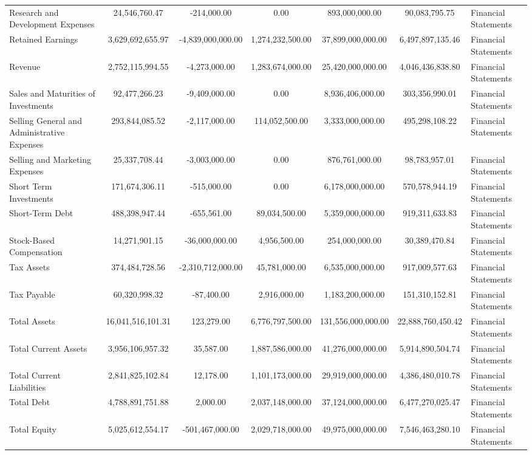 \begin{tabular}{lccccc}
Research and Development Expenses & 24,546,760.47 & -214,000.00 & 0.00 & 893,000,000.00 & 90,083,795.75 & Financial Statements \\
Retained Earnings & 3,629,692,655.97 & -4,839,000,000.00 & 1,274,232,500.00 & 37,899,000,000.00 & 6,497,897,135.46 & Financial Statements \\
Revenue & 2,752,115,994.55 & -4,273,000.00 & 1,283,674,000.00 & 25,420,000,000.00 & 4,046,436,838.80 & Financial Statements \\
Sales and Maturities of Investments & 92,477,266.23 & -9,409,000.00 & 0.00 & 8,936,406,000.00 & 303,356,990.01 & Financial Statements \\
Selling General and Administrative Expenses & 293,844,085.52 & -2,117,000.00 & 114,052,500.00 & 3,333,000,000.00 & 495,298,108.22 & Financial Statements \\
Selling and Marketing Expenses & 25,337,708.44 & -3,003,000.00 & 0.00 & 876,761,000.00 & 98,783,957.01 & Financial Statements \\
Short Term Investments & 171,674,306.11 & -515,000.00 & 0.00 & 6,178,000,000.00 & 570,578,944.19 & Financial Statements \\
Short-Term Debt & 488,398,947.44 & -655,561.00 & 89,034,500.00 & 5,359,000,000.00 & 919,311,633.83 & Financial Statements \\
Stock-Based Compensation & 14,271,901.15 & -36,000,000.00 & 4,956,500.00 & 254,000,000.00 & 30,389,470.84 & Financial Statements \\
Tax Assets & 374,484,728.56 & -2,310,712,000.00 & 45,781,000.00 & 6,535,000,000.00 & 917,009,577.63 & Financial Statements \\
Tax Payable & 60,320,998.32 & -87,400.00 & 2,916,000.00 & 1,183,200,000.00 & 151,310,152.81 & Financial Statements \\
Total Assets & 16,041,516,101.31 & 123,279.00 & 6,776,797,500.00 & 131,556,000,000.00 & 22,888,760,450.42 & Financial Statements \\
Total Current Assets & 3,956,106,957.32 & 35,587.00 & 1,887,586,000.00 & 41,276,000,000.00 & 5,914,890,504.74 & Financial Statements \\
Total Current Liabilities & 2,841,825,102.84 & 12,178.00 & 1,101,173,000.00 & 29,919,000,000.00 & 4,386,480,010.78 & Financial Statements \\
Total Debt & 4,788,891,751.88 & 2,000.00 & 2,037,148,000.00 & 37,124,000,000.00 & 6,477,270,025.47 & Financial Statements \\
Total Equity & 5,025,612,554.17 & -501,467,000.00 & 2,029,718,000.00 & 49,975,000,000.00 & 7,546,463,280.10 & Financial Statements \\

\end{tabular}
